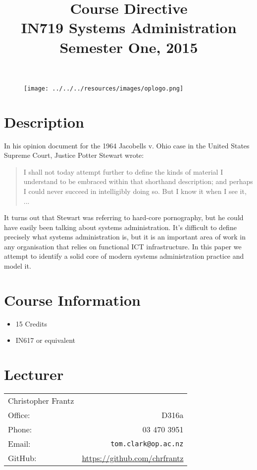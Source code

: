 \documentclass{article}
\begin{document}
\begin{figure}
\texttt{[image: ../../../resources/images/oplogo.png]}
\end{figure}

\title{Course Directive\\IN719 Systems Administration \\Semester One, 2015}
\date{}
\maketitle

\section*{Description}
In his opinion document for the 1964 Jacobells v. Ohio case in the United States Supreme Court, Justice Potter Stewart wrote:
\begin{quote}
I shall not today attempt further to define the kinds of material I understand to be embraced within that shorthand description; and perhaps I could never succeed in intelligibly doing so. But I know it when I see it, ...
\end{quote}
It turns out that Stewart was referring to hard-core pornography, but he could have easily been talking about systems administration. It's difficult to define precisely what systems administration is, but it is an important area of work in any organisation that relies on functional ICT infrastructure. In this paper we attempt to identify a solid core of modern systems administration practice and model it.



\section*{Course Information}
\begin{itemize}
  \item 15 Credits
  \item IN617 or equivalent
\end{itemize}

\section*{Lecturer}
\begin{tabular}{lr}

  Christopher Frantz &    \\
     Office: & D316a \\
     Phone: & 03 470 3951 \\
     Email: & \texttt{tom.clark@op.ac.nz} \\
     GitHub: & \url{https://github.com/chrfrantz} 
\end{tabular}
\end{document}
